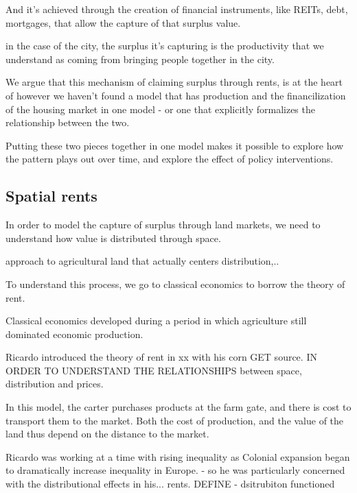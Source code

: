\documentclass[]{article}
\begin{document}
And it's achieved through the creation of financial instruments, like REITs, debt, mortgages,  that allow the capture of that surplus value.

in the case of the city, the surplus it's capturing is the productivity that we understand as coming from bringing people together in the city. 

We argue that this mechanism of claiming surplus through rents, is at the heart of %
however we haven't found a model that has production and the financilization of the housing market in one model - or one that explicitly formalizes the relationship between the two. 

Putting these two pieces together in one model makes it possible to explore how the pattern plays out over time, and explore the effect of policy interventions. 



\subsection{Spatial rents}
In order to model the capture of surplus through land markets, we need to understand how value is distributed through space.


approach to agricultural land that actually centers distribution,..

To understand this process, we go to classical economics to borrow the theory of rent.   

Classical economics developed during a period in which agriculture still dominated economic production.

Ricardo introduced the theory of rent in xx with his corn GET source.  IN ORDER TO UNDERSTAND THE RELATIONSHIPS between space, distribution and prices.

In this model, the carter purchases products at the farm gate, and there is cost to transport them to the market. Both the cost of production, and the value of the land thus depend on the distance to the market.  

Ricardo was working at a time with rising inequality as Colonial expansion began to dramatically increase inequality in Europe. - so he was particularly concerned with the distributional effects in his...  rents. DEFINE - dsitrubiton functioned
\end{document}
